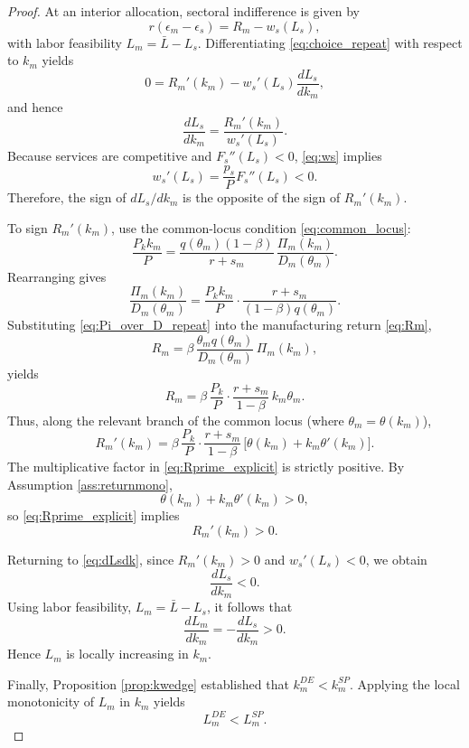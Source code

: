 \documentclass[12pt]{article}
\begin{document}
\begin{proof}
At an interior allocation, sectoral indifference is given by
\begin{equation}\label{eq:choice_repeat}
r(\epsilon_m-\epsilon_s)=R_m-w_s(L_s),
\end{equation}
with labor feasibility $L_m=\bar L-L_s$. Differentiating \eqref{eq:choice_repeat} with respect to $k_m$ yields
\[
0=R_m'(k_m)-w_s'(L_s)\frac{dL_s}{dk_m},
\]
and hence
\begin{equation}\label{eq:dLsdk}
\frac{dL_s}{dk_m}=\frac{R_m'(k_m)}{w_s'(L_s)}.
\end{equation}
Because services are competitive and $F_s''(L_s)<0$, \eqref{eq:ws} implies
\[
w_s'(L_s)=\frac{p_s}{P}F_s''(L_s)<0.
\]
Therefore, the sign of $dL_s/dk_m$ is the opposite of the sign of $R_m'(k_m)$.

To sign $R_m'(k_m)$, use the common-locus condition \eqref{eq:common_locus}:
\[
\frac{P_k k_m}{P}
=
\frac{q(\theta_m)(1-\beta)}{r+s_m}\,
\frac{\Pi_m(k_m)}{D_m(\theta_m)}.
\]
Rearranging gives
\begin{equation}\label{eq:Pi_over_D_repeat}
\frac{\Pi_m(k_m)}{D_m(\theta_m)}
=
\frac{P_k k_m}{P}\cdot\frac{r+s_m}{(1-\beta)q(\theta_m)}.
\end{equation}
Substituting \eqref{eq:Pi_over_D_repeat} into the manufacturing return \eqref{eq:Rm},
\[
R_m
=
\beta\,\frac{\theta_m q(\theta_m)}{D_m(\theta_m)}\,\Pi_m(k_m),
\]
yields
\begin{equation}\label{eq:Rm_k_theta}
R_m
=
\beta\,\frac{P_k}{P}\cdot\frac{r+s_m}{1-\beta}\,k_m\theta_m.
\end{equation}
Thus, along the relevant branch of the common locus (where $\theta_m=\theta(k_m)$),
\begin{equation}\label{eq:Rprime_explicit}
R_m'(k_m)
=
\beta\,\frac{P_k}{P}\cdot\frac{r+s_m}{1-\beta}\,
\bigl[\theta(k_m)+k_m\theta'(k_m)\bigr].
\end{equation}
The multiplicative factor in \eqref{eq:Rprime_explicit} is strictly positive. By Assumption \ref{ass:returnmono},
\[
\theta(k_m)+k_m\theta'(k_m)>0,
\]
so \eqref{eq:Rprime_explicit} implies
\[
R_m'(k_m)>0.
\]

Returning to \eqref{eq:dLsdk}, since $R_m'(k_m)>0$ and $w_s'(L_s)<0$, we obtain
\[
\frac{dL_s}{dk_m}<0.
\]
Using labor feasibility, $L_m=\bar L-L_s$, it follows that
\[
\frac{dL_m}{dk_m}=-\frac{dL_s}{dk_m}>0.
\]
Hence $L_m$ is locally increasing in $k_m$.

Finally, Proposition \ref{prop:kwedge} established that $k_m^{DE}<k_m^{SP}$. Applying the local monotonicity of $L_m$ in $k_m$ yields
\[
L_m^{DE}<L_m^{SP}.
\]
\end{proof}
\end{document}
